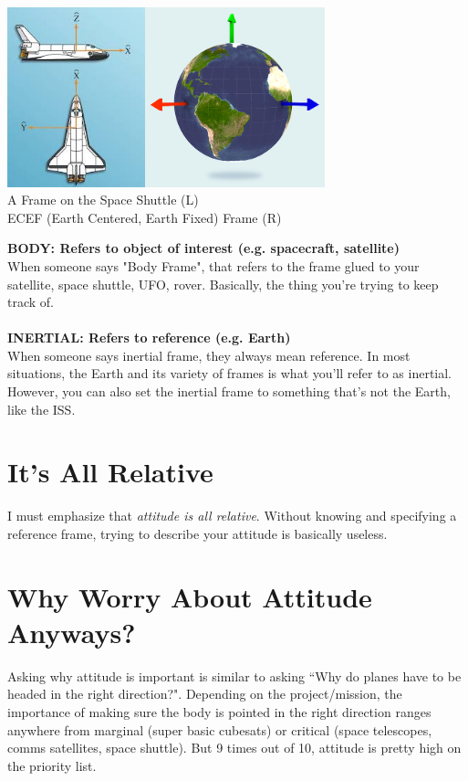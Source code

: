 \documentclass[a4paper,14pt]{extreport}
\begin{document}
\begin{center}
\includegraphics[width=4cm]{shuttle_body_frame}\includegraphics[height=5.2cm]{ecef}\\
A Frame on the Space Shuttle (L) \\ ECEF (Earth Centered, Earth Fixed) Frame (R)
\end{center}
\textbf{BODY: Refers to object of interest (e.g. spacecraft, satellite)}\\
When someone says "Body Frame", that refers to the frame glued to your satellite, space shuttle, UFO, rover. Basically, the thing you're trying to keep track of.\\\\
\textbf{INERTIAL: Refers to reference (e.g. Earth)}\\
When someone says inertial frame, they always mean reference. In most situations, the Earth and its variety of frames is what you'll refer to as inertial. However, you can also set the inertial frame to something that's not the Earth, like the ISS.\\

\section{It's All Relative}
I must emphasize that \emph{attitude is all relative}. Without knowing and specifying a reference frame, trying to describe your attitude is basically useless. 

\section{Why Worry About Attitude Anyways?}
Asking why attitude is important is similar to asking ``Why do planes have to be headed in the right direction?". Depending on the project/mission, the importance of making sure the body is pointed in the right direction ranges anywhere from marginal (super basic cubesats) or critical (space telescopes, comms satellites, space shuttle). But 9 times out of 10, attitude is pretty high on the priority list. 
\end{document}
